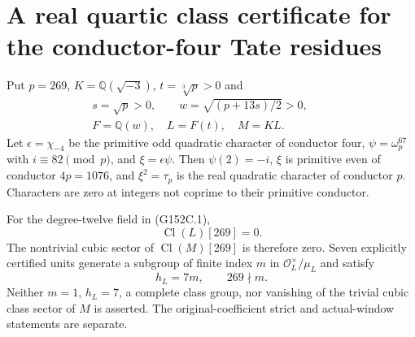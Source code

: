 \section{A real quartic class certificate for the conductor-four Tate residues}
\label{sec:conductor4-quartic-class-certificate}

Put $p=269$, $K=\mathbb Q(\sqrt{-3})$, $t=\sqrt[3]p>0$ and
\[
 \begin{gathered}
 s=\sqrt p>0,\qquad w=\sqrt{(p+13s)/2}>0,\qquad\\
 F=\mathbb Q(w),\quad L=F(t),\quad M=KL.
 \end{gathered}
 \tag{G152C.1}
\]
Let $\epsilon=\chi_{-4}$ be the primitive odd quadratic character
of conductor four, $\psi=\omega_p^{67}$ with $i\equiv82\pmod p$,
and $\xi=\epsilon\psi$.
Then $\psi(2)=-i$, $\xi$ is primitive even of conductor $4p=1076$,
and $\xi^2=\tau_p$ is the real quadratic character of conductor $p$.
Characters are zero at integers not coprime to their primitive conductor.

\begin{theorem}
\label{AC-G152-class}
For the degree-twelve field in (G152C.1),
\[
                         \operatorname{Cl}(L)[269]=0.
 \tag{G152C.2}
\]
The nontrivial cubic sector of $\operatorname{Cl}(M)[269]$ is
therefore zero.
Seven explicitly certified units generate a subgroup of finite
index $m$ in $\mathcal O_L^\times/\mu_L$ and satisfy
\[
                             h_L=7m,\qquad269\nmid m.
 \tag{G152C.3}
\]
Neither $m=1$, $h_L=7$, a complete class group, nor vanishing
of the trivial cubic class sector of $M$ is asserted.
The original-coefficient strict and actual-window statements are separate.
\end{theorem}

